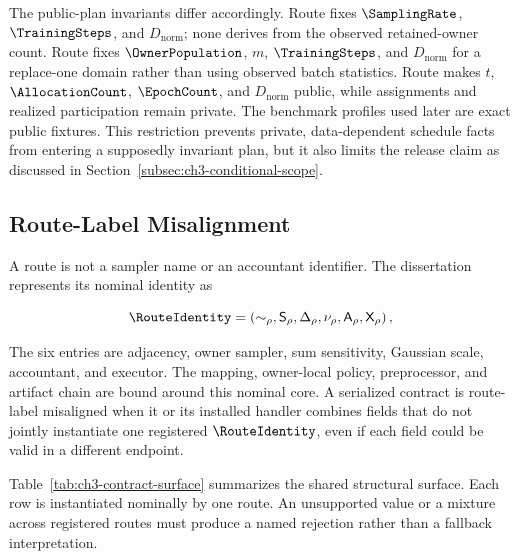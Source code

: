 The public-plan invariants differ accordingly.  Route \RouteP{} fixes
\(\SamplingRate\), \(\TrainingSteps\), and \(D_{\mathrm{norm}}\); none derives
from the observed retained-owner count.  Route \RouteF{} fixes
\(\OwnerPopulation\), \(m\), \(\TrainingSteps\), and \(D_{\mathrm{norm}}\) for
a replace-one domain rather than using observed batch statistics.  Route
\RouteA{} makes \(t\), \(\AllocationCount\), \(\EpochCount\), and
\(D_{\mathrm{norm}}\) public, while assignments and realized participation remain
private.  The benchmark profiles used later are exact public fixtures.
This restriction prevents private, data-dependent schedule facts from entering a
supposedly invariant plan, but it also limits the release claim as discussed in
Section~\ref{subsec:ch3-conditional-scope}.

\subsection{Route-Label Misalignment}
\label{subsec:ch3-route-label-misalignment}

A route is not a sampler name or an accountant identifier.  The dissertation
represents its nominal identity as

\begin{equation}
    \RouteIdentity
    =
    \left(
        {\sim}_{\rho},
        \mathsf S_{\rho},
        \Delta_{\rho},
        \nu_{\rho},
        \mathsf A_{\rho},
        \mathsf X_{\rho}
    \right),
\label{eq:ch3-route-identity}
\end{equation}

The six entries are adjacency, owner sampler, sum sensitivity, Gaussian scale,
accountant, and executor.  The mapping, owner-local policy, preprocessor, and
artifact chain are bound around this nominal core.  A serialized contract is
route-label misaligned when it or its installed handler combines fields that do
not jointly instantiate one registered \(\RouteIdentity\), even if each field
could be valid in a different endpoint.

Table~\ref{tab:ch3-contract-surface} summarizes the shared structural surface.
Each row is instantiated nominally by one route.  An unsupported value or a
mixture across registered routes must produce a named rejection rather than a
fallback interpretation.


